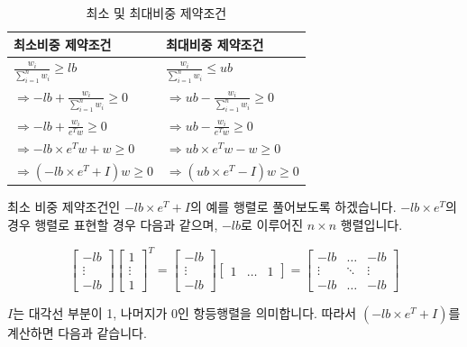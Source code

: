 \documentclass[12pt,]{book}
\begin{document}
\begin{table}[!h]

\caption{\label{tab:mdpconst}최소 및 최대비중 제약조건}
\centering
\begin{tabu} to 
\toprule
최소비중 제약조건 & 최대비중 제약조건\\
\midrule
{}  $\frac{w_i}{\sum_{i=1}^nw_i} \ge lb$ & $\frac{w_i}{\sum_{i=1}^nw_i} \le ub$\\
$\Rightarrow -lb + \frac{w_i}{\sum_{i=1}^nw_i} \ge 0$ & $\Rightarrow ub - \frac{w_i}{\sum_{i=1}^nw_i} \ge 0$\\
  $\Rightarrow -lb + \frac{w_i}{e^Tw} \ge 0$ & $\Rightarrow ub - \frac{w_i}{e^Tw} \ge 0$\\
$\Rightarrow -lb \times e^Tw + w \ge 0$ & $\Rightarrow ub \times e^Tw - w \ge 0$\\
  $\Rightarrow (-lb \times e^T + I)w \ge 0$ & $\Rightarrow (ub \times e^T - I)w \ge 0$\\
\bottomrule
\end{tabu}
\end{table}

최소 비중 제약조건인 \(-lb \times e^T + I\)의 예를 행렬로 풀어보도록 하겠습니다. \(-lb \times e^T\)의 경우 행렬로 표현할 경우 다음과 같으며, \(-lb\)로 이루어진 \(n \times n\) 행렬입니다.

\[ \begin{bmatrix} -lb \\ \vdots \\ -lb \end{bmatrix}
\begin{bmatrix} 1 \\ \vdots \\ 1 \end{bmatrix}^T 
= \begin{bmatrix} -lb \\ \vdots \\ -lb \end{bmatrix}
\begin{bmatrix} 1 & \dots & 1 \end{bmatrix}  
= \begin{bmatrix} -lb & \dots & -lb \\ \vdots & \ddots & \vdots \\ -lb & \dots & -lb \end{bmatrix}\]

\(I\)는 대각선 부분이 1, 나머지가 0인 항등행렬을 의미합니다. 따라서 \((-lb \times e^T + I)\)를 계산하면 다음과 같습니다.
\end{document}
